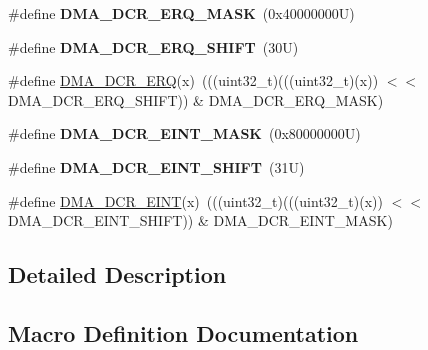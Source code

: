 \begin{DoxyCompactItemize}
\item 
\mbox{\label{group___d_m_a___register___masks_gaf7a7b51a343f7ce8a595f528aae583be}} 
\#define {\bfseries D\+M\+A\+\_\+\+D\+C\+R\+\_\+\+E\+R\+Q\+\_\+\+M\+A\+SK}~(0x40000000\+U)
\item 
\mbox{\label{group___d_m_a___register___masks_gafc3838d15550b818d421a160ea57a247}} 
\#define {\bfseries D\+M\+A\+\_\+\+D\+C\+R\+\_\+\+E\+R\+Q\+\_\+\+S\+H\+I\+FT}~(30\+U)
\item 
\#define \mbox{\hyperlink{group___d_m_a___register___masks_ga5679f508c1d116a1caeac40591e72a19}{D\+M\+A\+\_\+\+D\+C\+R\+\_\+\+E\+RQ}}(x)~(((uint32\+\_\+t)(((uint32\+\_\+t)(x)) $<$$<$ D\+M\+A\+\_\+\+D\+C\+R\+\_\+\+E\+R\+Q\+\_\+\+S\+H\+I\+FT)) \& D\+M\+A\+\_\+\+D\+C\+R\+\_\+\+E\+R\+Q\+\_\+\+M\+A\+SK)
\item 
\mbox{\label{group___d_m_a___register___masks_gac5427564104425fdb45a492386cf05e7}} 
\#define {\bfseries D\+M\+A\+\_\+\+D\+C\+R\+\_\+\+E\+I\+N\+T\+\_\+\+M\+A\+SK}~(0x80000000\+U)
\item 
\mbox{\label{group___d_m_a___register___masks_gaee74e1c480eec935c3864d892445db29}} 
\#define {\bfseries D\+M\+A\+\_\+\+D\+C\+R\+\_\+\+E\+I\+N\+T\+\_\+\+S\+H\+I\+FT}~(31\+U)
\item 
\#define \mbox{\hyperlink{group___d_m_a___register___masks_ga715e71ce79ff150e5b9be7fc61a7bb8f}{D\+M\+A\+\_\+\+D\+C\+R\+\_\+\+E\+I\+NT}}(x)~(((uint32\+\_\+t)(((uint32\+\_\+t)(x)) $<$$<$ D\+M\+A\+\_\+\+D\+C\+R\+\_\+\+E\+I\+N\+T\+\_\+\+S\+H\+I\+FT)) \& D\+M\+A\+\_\+\+D\+C\+R\+\_\+\+E\+I\+N\+T\+\_\+\+M\+A\+SK)
\end{DoxyCompactItemize}


\subsection{Detailed Description}


\subsection{Macro Definition Documentation}
\mbox{\label{group___d_m_a___register___masks_ga61f5171a3627441884096a69a3f33ca5}} 
